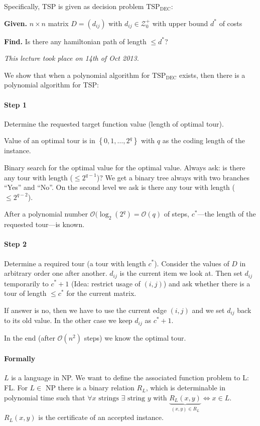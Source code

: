 \documentclass[a4paper]{article}
\newcommand{\given}[1]{\textbf{Given.} #1\par}
\newcommand{\find}[1]{\textbf{Find.} #1\par}
\newcommand{\cls}[1]{\rm{#1}}
\newcommand{\set}[1]{\left\{#1\right\}}
\newcommand{\dateref}[1]{\emph{This lecture took place on #1.}\par}
\newenvironment{spec}[0]{\begin{framed}}{\end{framed}}
\begin{document}
Specifically, TSP is given as decision problem $\text{TSP}_{\text{DEC}}$:
\begin{spec}
  \given{$n \times n$ matrix $D = (d_{ij})$ with $d_{ij} \in \mathcal{Z}_0^+$ with upper bound $d^*$ of costs}
  \find{Is there any hamiltonian path of length $\leq d^*$?}
\end{spec}

\dateref{14th of Oct 2013}

We show that when a polynomial algorithm for $\text{TSP}_{\text{DEC}}$ exists, then there is a polynomial algorithm for TSP:

\paragraph{Step 1}
Determine the requested target function value (length of optimal tour).

Value of an optimal tour is in $\set{0,1,\ldots,2^q}$ with $q$ as the coding length
of the instance.

Binary search for the optimal value for the optimal value. Always ask:
is there any tour with length ($\leq 2^{q-1}$)? We get a binary tree always
with two branches ``Yes'' and ``No''. On the second level we ask is there any
tour with length ($\leq 2^{q-2}$).

After a polynomial number $\mathcal{O}(\log_2(2^q) = \mathcal{O}(q)$ of steps,
$c^*$---the length of the requested tour---is known.

\paragraph{Step 2}
Determine a required tour (a tour with length $c^*$).
Consider the values of $D$ in arbitrary order one after another.
$d_{ij}$ is the current item we look at. Then set $d_{ij}$ temporarily to $c^* + 1$
(Idea: restrict usage of $(i,j)$) and ask whether there is a tour of length $\leq c^*$
for the current matrix.

If answer is no, then we have to use the current edge $(i,j)$ and we set $d_{ij}$ back
to its old value. In the other case we keep $d_{ij}$ as $c^* + 1$.

In the end (after $\mathcal{O}(n^2)$ steps) we know the optimal tour.

\paragraph{Formally}
$L$ is a language in \cls{NP}. We want to define the associated function problem to L: FL.
For $L \in $ \cls{NP} there is a binary relation $R_L$, which is determinable in polynomial
time such that $\forall x \text{ strings } \exists \text{ string } y$ with
$\underbrace{R_L(x,y)}_{(x,y) \in R_L} \Leftrightarrow x \in L$. $R_L(x,y)$ is the
certificate of an accepted instance. 
\end{document}
